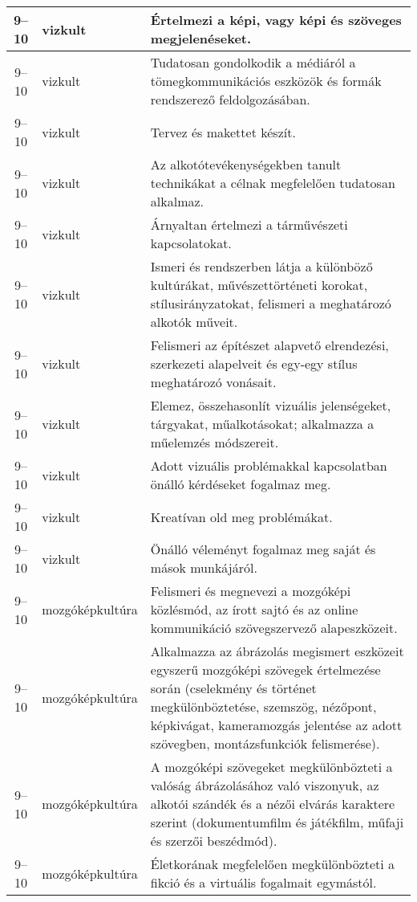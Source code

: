 \begin{small}
\begin{longtable}{c | p{2cm} |  p{11cm} }
              9--10 & vizkult & Értelmezi a képi, vagy képi és szöveges megjelenéseket. \\ \hline
              9--10 & vizkult & Tudatosan gondolkodik a médiáról a tömegkommunikációs eszközök és formák rendszerező feldolgozásában. \\ \hline
              9--10 & vizkult & Tervez és makettet készít. \\ \hline
              9--10 & vizkult & Az alkotótevékenységekben tanult technikákat a célnak megfelelően tudatosan alkalmaz. \\ \hline
              9--10 & vizkult & Árnyaltan értelmezi a tárművészeti kapcsolatokat. \\ \hline
              9--10 & vizkult & Ismeri és rendszerben látja a különböző kultúrákat, művészettörténeti korokat, stílusirányzatokat, felismeri a meghatározó alkotók műveit. \\ \hline
              9--10 & vizkult & Felismeri az építészet alapvető elrendezési, szerkezeti alapelveit és egy-egy stílus meghatározó vonásait. \\ \hline
              9--10 & vizkult & Elemez, összehasonlít vizuális jelenségeket, tárgyakat, műalkotásokat; alkalmazza a műelemzés módszereit. \\ \hline
              9--10 & vizkult & Adott vizuális problémakkal kapcsolatban önálló kérdéseket fogalmaz meg. \\ \hline
              9--10 & vizkult & Kreatívan old meg problémákat. \\ \hline
              9--10 & vizkult & Önálló véleményt fogalmaz meg saját és mások munkájáról. \\ \hline
              9--10 & mozgókép\-kultúra & Felismeri és megnevezi a mozgóképi közlésmód, az írott sajtó és az online kommunikáció szövegszervező alapeszközeit. \\ \hline
              9--10 & mozgókép\-kultúra & Alkalmazza az ábrázolás megismert eszközeit egyszerű mozgóképi szövegek értelmezése során (cselekmény és történet megkülönböztetése, szemszög, nézőpont, képkivágat, kameramozgás jelentése az adott szövegben, montázsfunkciók felismerése). \\ \hline
              9--10 & mozgókép\-kultúra & A mozgóképi szövegeket megkülönbözteti a valóság ábrázolásához való viszonyuk, az alkotói szándék és a nézői elvárás karaktere szerint (dokumentumfilm és játékfilm, műfaji és szerzői beszédmód). \\ \hline
              9--10 & mozgókép\-kultúra & Életkorának megfelelően megkülönbözteti a fikció és a virtuális fogalmait egymástól.  \\ \hline

\end{longtable}
\end{small}
